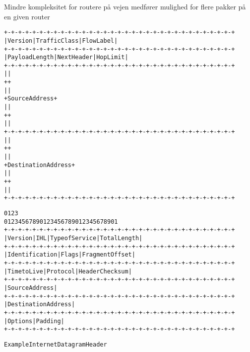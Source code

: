\documentclass[Screen16to9,17pt]{foils}
\begin{document}
Mindre kompleksitet for routere på vejen medfører
mulighed for flere pakker på en given router


\begin{alltt}\footnotesize
   +-+-+-+-+-+-+-+-+-+-+-+-+-+-+-+-+-+-+-+-+-+-+-+-+-+-+-+-+-+-+-+-+
   |Version| Traffic Class |           Flow Label                  |
   +-+-+-+-+-+-+-+-+-+-+-+-+-+-+-+-+-+-+-+-+-+-+-+-+-+-+-+-+-+-+-+-+
   |         Payload Length        |  Next Header  |   Hop Limit   |
   +-+-+-+-+-+-+-+-+-+-+-+-+-+-+-+-+-+-+-+-+-+-+-+-+-+-+-+-+-+-+-+-+
   |                                                               |
   +                                                               +
   |                                                               |
   +                         Source Address                        +
   |                                                               |
   +                                                               +
   |                                                               |
   +-+-+-+-+-+-+-+-+-+-+-+-+-+-+-+-+-+-+-+-+-+-+-+-+-+-+-+-+-+-+-+-+
   |                                                               |
   +                                                               +
   |                                                               |
   +                      Destination Address                      +
   |                                                               |
   +                                                               +
   |                                                               |
   +-+-+-+-+-+-+-+-+-+-+-+-+-+-+-+-+-+-+-+-+-+-+-+-+-+-+-+-+-+-+-+-+
\end{alltt}


\begin{alltt}\small
    0                   1                   2                   3
    0 1 2 3 4 5 6 7 8 9 0 1 2 3 4 5 6 7 8 9 0 1 2 3 4 5 6 7 8 9 0 1
   +-+-+-+-+-+-+-+-+-+-+-+-+-+-+-+-+-+-+-+-+-+-+-+-+-+-+-+-+-+-+-+-+
   |Version|  IHL  |Type of Service|          Total Length         |
   +-+-+-+-+-+-+-+-+-+-+-+-+-+-+-+-+-+-+-+-+-+-+-+-+-+-+-+-+-+-+-+-+
   |         Identification        |Flags|      Fragment Offset    |
   +-+-+-+-+-+-+-+-+-+-+-+-+-+-+-+-+-+-+-+-+-+-+-+-+-+-+-+-+-+-+-+-+
   |  Time to Live |    Protocol   |         Header Checksum       |
   +-+-+-+-+-+-+-+-+-+-+-+-+-+-+-+-+-+-+-+-+-+-+-+-+-+-+-+-+-+-+-+-+
   |                       Source Address                          |
   +-+-+-+-+-+-+-+-+-+-+-+-+-+-+-+-+-+-+-+-+-+-+-+-+-+-+-+-+-+-+-+-+
   |                    Destination Address                        |
   +-+-+-+-+-+-+-+-+-+-+-+-+-+-+-+-+-+-+-+-+-+-+-+-+-+-+-+-+-+-+-+-+
   |                    Options                    |    Padding    |
   +-+-+-+-+-+-+-+-+-+-+-+-+-+-+-+-+-+-+-+-+-+-+-+-+-+-+-+-+-+-+-+-+

                    Example Internet Datagram Header
\end{alltt}
\end{document}

